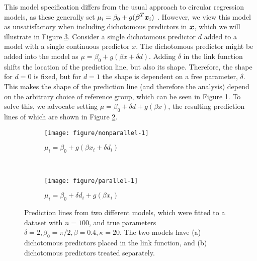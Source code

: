 This model specification differs from the usual approach to circular regression models, as these generally set \( \mu_i = \beta_0 + g(\boldsymbol{\beta}^T \boldsymbol{x}_i)\) \citep{fisher1992regression, gill2010, lagona2016regression}. However, we view this model as unsatisfactory when including dichotomous predictors in \( \boldsymbol{x} \), which we will illustrate in Figure \ref{parallelnonparallel}. Consider a single dichotomous predictor \( d \) added to a model with a single continuous predictor \( x \). The dichotomous predictor might be added into the model as \( \mu = \beta_0 + g(\beta x + \delta d ) \). Adding \( \delta \) in the link function shifts the location of the prediction line, but also its shape. Therefore, the shape for \( d = 0 \) is fixed, but for \( d = 1 \) the shape is dependent on a free parameter, \( \delta \). This makes the shape of the prediction line (and therefore the analysis) depend on the arbitrary choice of reference group, which can be seen in Figure \ref{nonparallel}. To solve this, we advocate setting \( \mu = \beta_0 + \delta d + g(\beta x ) \), the resulting prediction lines of which are shown in Figure \ref{parallel}.

\begin{figure}

\begin{subfigure}[b]{0.5\textwidth}



\begin{knitrout}
\color{fgcolor}
\texttt{[image: figure/nonparallel-1]} 

\end{knitrout}
\caption{$\mu_i = \beta_0 + g(\beta x_i  + \delta d_i)$}
\label{nonparallel}
\end{subfigure}
~
\begin{subfigure}[b]{0.5\textwidth}
\begin{knitrout}
\color{fgcolor}
\texttt{[image: figure/parallel-1]} 

\end{knitrout}
\caption{$\mu_i = \beta_0  + \delta d_i + g(\beta x_i)$}
\label{parallel}
\end{subfigure}

\caption{Prediction lines from two different models, which were fitted to a dataset with $n = 100$, and true parameters $\delta = 2, \beta_0 = \pi/2, \beta = 0.4, \kappa = 20$. The two models have (a) dichotomous predictors placed in the link function, and (b) dichotomous predictors treated separately.}
\label{parallelnonparallel}
\end{figure}

